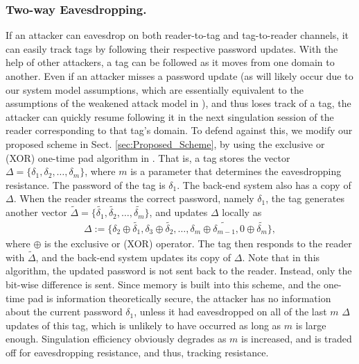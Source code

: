 \subsubsection{Two-way Eavesdropping.}
If an attacker can eavesdrop on both reader-to-tag and tag-to-reader channels, it can easily track tags by following their respective password updates.  With the help of other attackers, a tag can be followed as it moves from one domain to another.  Even if an attacker misses a password update (as will likely occur due to our system model assumptions, which are essentially equivalent to the assumptions of the weakened attack model in \cite{conf:Juels01}), and thus loses track of a tag, the attacker can quickly resume following it in the next singulation session of the reader corresponding to that tag's domain.  To defend against this, we modify our proposed scheme in Sect. \ref{sec:Proposed_Scheme}, by using the exclusive or (XOR) one-time pad algorithm in \cite{conf:Juels01}.  That is, a tag stores the vector $\Delta = \{ \delta_1, \delta_2, \ldots, \delta_m \}$, where $m$ is a parameter that determines the eavesdropping resistance.  The password of the tag is $\delta_1$.  The back-end system also has a copy of $\Delta$.  When the reader streams the correct password, namely $\delta_1$, the tag generates another vector $\tilde{\Delta} = \{ \tilde{\delta_1}, \tilde{\delta_2}, \ldots, \tilde{\delta_m} \}$, and updates $\Delta$ locally as
\begin{eqnarray}
\Delta := \{ \delta_2 \oplus \tilde{\delta_1}, \delta_3 \oplus \tilde{\delta_2}, \ldots , \delta_m \oplus \tilde{\delta_{m-1}}, 0 \oplus \tilde{\delta_m} \}, \nonumber
\end{eqnarray}
where $\oplus$ is the exclusive or (XOR) operator.  The tag then responds to the reader with $\tilde{\Delta}$, and the back-end system updates its copy of $\Delta$.  Note that in this algorithm, the updated password is not sent back to the reader.  Instead, only the bit-wise difference is sent.  Since memory is built into this scheme, and the one-time pad is information theoretically secure, the attacker has no information about the current password $\delta_1$, unless it had eavesdropped on all of the last $m$ $\Delta$ updates of this tag, which is unlikely to have occurred as long as $m$ is large enough.  Singulation efficiency obviously degrades as $m$ is increased, and is traded off for eavesdropping resistance, and thus, tracking resistance.

